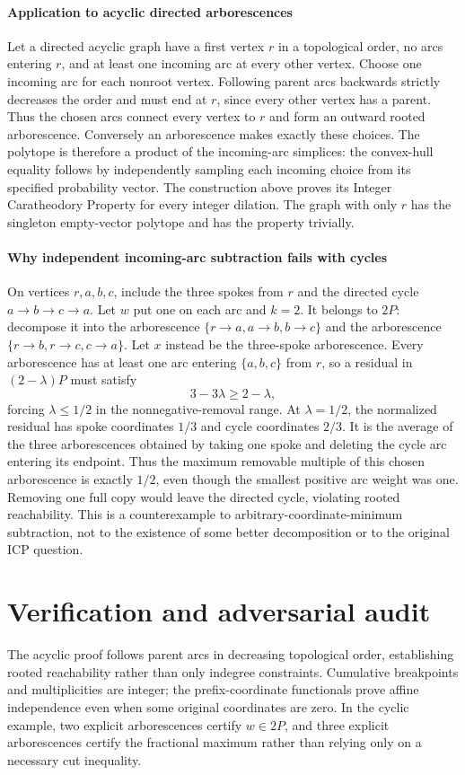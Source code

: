 \documentclass[11pt]{article}
\begin{document}
\paragraph{Application to acyclic directed arborescences}
Let a directed acyclic graph have a first vertex $r$ in a topological order, no arcs entering $r$, and at least one incoming arc at every other vertex. Choose one incoming arc for each nonroot vertex. Following parent arcs backwards strictly decreases the order and must end at $r$, since every other vertex has a parent. Thus the chosen arcs connect every vertex to $r$ and form an outward rooted arborescence. Conversely an arborescence makes exactly these choices. The polytope is therefore a product of the incoming-arc simplices: the convex-hull equality follows by independently sampling each incoming choice from its specified probability vector. The construction above proves its Integer Caratheodory Property for every integer dilation. The graph with only $r$ has the singleton empty-vector polytope and has the property trivially.

\paragraph{Why independent incoming-arc subtraction fails with cycles}
On vertices $r,a,b,c$, include the three spokes from $r$ and the directed cycle $a\to b\to c\to a$. Let $w$ put one on each arc and $k=2$. It belongs to $2P$: decompose it into the arborescence $\{r\to a,a\to b,b\to c\}$ and the arborescence $\{r\to b,r\to c,c\to a\}$. Let $x$ instead be the three-spoke arborescence. Every arborescence has at least one arc entering $\{a,b,c\}$ from $r$, so a residual in $(2-\lambda)P$ must satisfy
\[
 3-3\lambda\geq2-\lambda,
\]
forcing $\lambda\leq1/2$ in the nonnegative-removal range. At $\lambda=1/2$, the normalized residual has spoke coordinates $1/3$ and cycle coordinates $2/3$. It is the average of the three arborescences obtained by taking one spoke and deleting the cycle arc entering its endpoint. Thus the maximum removable multiple of this chosen arborescence is exactly $1/2$, even though the smallest positive arc weight was one. Removing one full copy would leave the directed cycle, violating rooted reachability. This is a counterexample to arbitrary-coordinate-minimum subtraction, not to the existence of some better decomposition or to the original ICP question.

\section{Verification and adversarial audit}
The acyclic proof follows parent arcs in decreasing topological order, establishing rooted reachability rather than only indegree constraints. Cumulative breakpoints and multiplicities are integer; the prefix-coordinate functionals prove affine independence even when some original coordinates are zero. In the cyclic example, two explicit arborescences certify $w\in2P$, and three explicit arborescences certify the fractional maximum rather than relying only on a necessary cut inequality.
\end{document}
